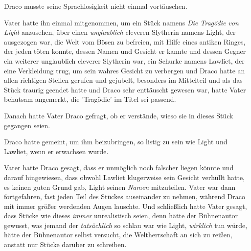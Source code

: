 Draco musste seine Sprachlosigkeit nicht einmal vortäuschen.

Vater hatte ihn einmal mitgenommen, um ein Stück namens \emph{Die Tragödie von Light} anzusehen, über einen \emph{unglaublich} cleveren Slytherin namens Light, der ausgezogen war, die Welt vom Bösen zu befreien, mit Hilfe eines antiken Ringes, der jeden töten konnte, dessen Namen und Gesicht er kannte und dessen Gegner ein weiterer unglaublich cleverer Slytherin war, ein Schurke namens Lawliet, der eine Verkleidung trug, um sein wahres Gesicht zu verbergen und Draco hatte an allen richtigen Stellen gerufen und gejubelt, besonders im Mittelteil und als das Stück traurig geendet hatte und Draco sehr enttäuscht gewesen war, hatte Vater behutsam angemerkt, die 'Tragödie' im Titel sei passend.

Danach hatte Vater Draco gefragt, ob er verstände, wieso sie in dieses Stück gegangen seien.

Draco hatte gemeint, um ihm beizubringen, so listig zu sein wie Light und Lawliet, wenn er erwachsen wurde.

Vater hatte Draco gesagt, dass er unmöglich noch falscher liegen könnte und darauf hingewiesen, dass obwohl Lawliet klugerweise sein Gesicht verhüllt hatte, es keinen guten Grund gab, Light seinen \emph{Namen} mitzuteilen. Vater war dann fortgefahren, fast jeden Teil des Stückes auseinander zu nehmen, während Draco mit immer größer werdenden Augen lauschte. Und schließlich hatte Vater gesagt, dass Stücke wie dieses \emph{immer} unrealistisch seien, denn hätte der Bühnenautor gewusst, was jemand der \emph{tatsächlich} so schlau war wie Light, \emph{wirklich} tun würde, hätte der Bühnenautor selbst versucht, die Weltherrschaft an sich zu reißen, anstatt nur Stücke darüber zu schreiben.


